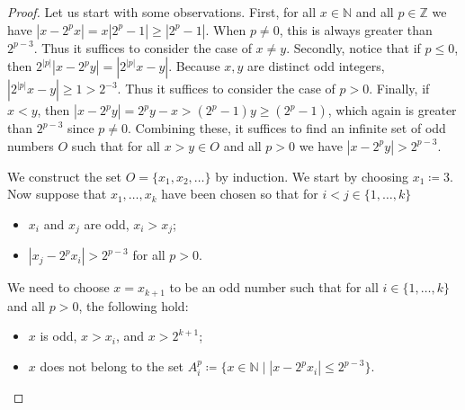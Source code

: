 \documentclass[reqno,12pt]{amsart}\setcounter{tocdepth}{1}
\theoremstyle{definition}
\newcommand{\N}{\mathbb{N}}
\newcommand{\Z}{\mathbb{Z}}
\numberwithin{equation}{section}
\begin{document}
\begin{proof}
    Let us start with some observations. First, for all $x \in \N$ and all $p \in \Z$ we have $|x - 2^px| = x|2^p - 1| \geq |2^p - 1|$. When $p \neq 0$, this is always greater than $2^{p-3}$. Thus it suffices to consider the case of $x \neq y$. Secondly, notice that if $p \leq 0$, then $2^{|p|}|x - 2^p y| = |2^{|p|}x - y|$. Because $x, y$ are distinct odd integers, $|2^{|p|}x - y| \geq 1 > 2^{-3}$. Thus it suffices to consider the case of $p > 0$. Finally, if $x < y$, then $|x - 2^py| = 2^py - x > (2^p - 1)y \geq (2^p-1)$, which again is greater than $2^{p-3}$ since $p \neq 0$. Combining these, it suffices to find an infinite set of odd numbers $O$ such that for all $x > y \in O$ and all $p > 0$ we have $|x - 2^py| > 2^{p-3}$.
    
    We construct the set $O=\{x_1,x_2,\dots\}$ by induction. We start by choosing $x_1 \coloneqq 3$. Now suppose that $x_1, \ldots, x_k$ have been chosen so that for $i < j \in \{ 1, \ldots, k \}$
    \begin{itemize}
        \item $x_i$ and $x_j$ are odd, $x_i > x_j$;
        \item $|x_j - 2^p x_i| > 2^{p-3}$ for all $p > 0$.
    \end{itemize}
    We need to choose $x = x_{k+1}$ to be an odd number such that for all $i \in \{1, \ldots, k\}$ and all $p > 0$, the following hold:
    \begin{itemize}
        \item $x$ is odd, $x > x_i$, and $x > 2^{k+1}$;
        \item $x$ does not belong to the set $A_i^p \coloneqq \{ x \in \N \mid |x - 2^p x_i| \leq 2^{p-3} \}$.
    \end{itemize}
    

\end{proof}
\end{document}
